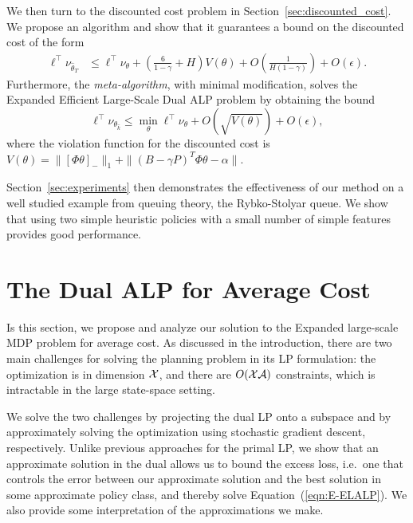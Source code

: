\documentclass[11pt]{article}
\begin{document}
We then turn to the discounted cost problem in Section~\ref{sec:discounted_cost}. We propose an algorithm and show that it guarantees a bound on the discounted cost of the form
\begin{align*}
  \ell^{\top} \nu_{\widehat\theta_T}
  &\leq
    \ell^{\top} \nu_{\theta} +
    \left( \frac{6}{1-\gamma} + H \right)
    V(\theta)
    +O\left(\frac{1}{H(1-\gamma)}\right)+O(\epsilon).
\end{align*}
Furthermore, the \emph{meta-algorithm}, with minimal modification, solves the Expanded Efficient Large-Scale Dual ALP problem by obtaining the bound 
\begin{equation*}
  \ell^\top\nu_{\theta_{\hat k}} \leq \min_\theta \ell^\top\nu_\theta
  + O\left(\sqrt{V(\theta)}\right)
  + O(\epsilon),
\end{equation*}
where the violation function for the discounted cost is $V(\theta) = \|\left[\Phi \theta \right]_{-}\|_1+\|(B-\gamma P)^T \Phi \theta  -\alpha\|$.
  
  Section~\ref{sec:experiments} then demonstrates the effectiveness of our method on a well studied example from queuing theory, the Rybko-Stolyar queue. We show that using two simple heuristic policies with a small number of simple features provides good performance.


\section{The Dual ALP for Average Cost}
\label{sec:average_cost}
  Is this section, we propose and analyze our solution to the Expanded large-scale MDP problem for average cost. As discussed in the introduction, there are two main challenges for solving the planning problem in its LP formulation: the optimization is in dimension ${\cal X}$, and there are $O({\cal X}{\cal A})$ constraints, which is intractable in the large state-space setting.

  We solve the two challenges by projecting the dual LP onto a subspace and by approximately solving the optimization using stochastic gradient descent, respectively. Unlike previous approaches for the primal LP, we show that an approximate solution in the dual allows us to bound the excess loss, i.e.\ one that controls the error between our approximate solution and the best solution in some approximate policy class, and thereby solve Equation~(\ref{eqn:E-ELALP}). We also provide some interpretation of the approximations we make.
\end{document}
